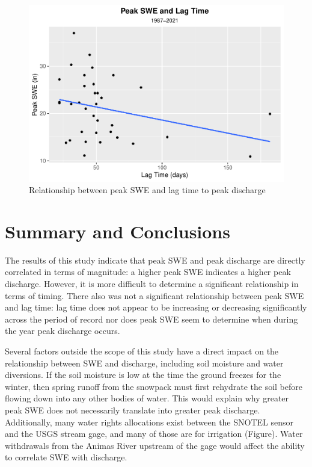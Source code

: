 \documentclass[
  12pt,
]{article}
\begin{document}
\begin{figure}
\centering
\includegraphics{McLaughlin_WDA_Project_files/figure-latex/unnamed-chunk-8-1.pdf}
\caption{Relationship between peak SWE and lag time to peak discharge}
\end{figure}

\newpage

\hypertarget{summary-and-conclusions}{%
\section{Summary and Conclusions}\label{summary-and-conclusions}}

The results of this study indicate that peak SWE and peak discharge are
directly correlated in terms of magnitude: a higher peak SWE indicates a
higher peak discharge. However, it is more difficult to determine a
significant relationship in terms of timing. There also was not a
significant relationship between peak SWE and lag time: lag time does
not appear to be increasing or decreasing significantly across the
period of record nor does peak SWE seem to determine when during the
year peak discharge occurs.

Several factors outside the scope of this study have a direct impact on
the relationship between SWE and discharge, including soil moisture and
water diversions. If the soil moisture is low at the time the ground
freezes for the winter, then spring runoff from the snowpack must first
rehydrate the soil before flowing down into any other bodies of water.
This would explain why greater peak SWE does not necessarily translate
into greater peak discharge. Additionally, many water rights allocations
exist between the SNOTEL sensor and the USGS stream gage, and many of
those are for irrigation (Figure). Water withdrawals from the Animas
River upstream of the gage would affect the ability to correlate SWE
with discharge.
\end{document}
